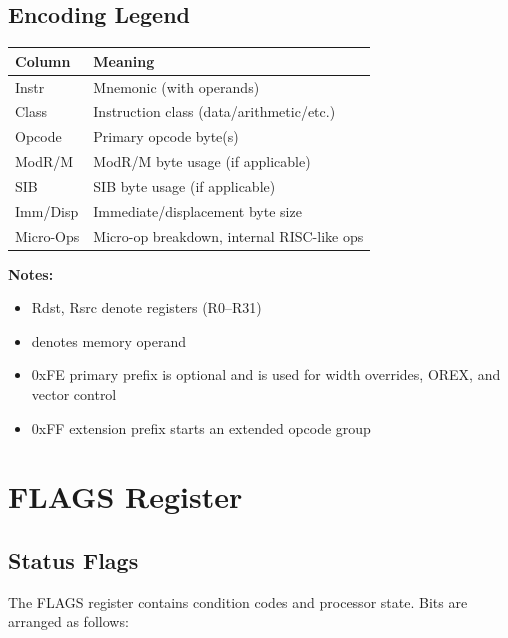 \documentclass[11pt]{article}
\begin{document}
\subsection{Encoding Legend}

\begin{table}[h]
\centering
\begin{tabular}{@{}ll@{}}
\toprule
\textbf{Column} & \textbf{Meaning} \\ \midrule
Instr & Mnemonic (with operands) \\
Class & Instruction class (data/arithmetic/etc.) \\
Opcode & Primary opcode byte(s) \\
ModR/M & ModR/M byte usage (if applicable) \\
SIB & SIB byte usage (if applicable) \\
Imm/Disp & Immediate/displacement byte size \\
Micro-Ops & Micro-op breakdown, internal RISC-like ops \\ \bottomrule
\end{tabular}
\end{table}

\textbf{Notes:}

\begin{itemize}
    \item Rdst, Rsrc denote registers (R0--R31)
    \item [mem] denotes memory operand
    \item 0xFE primary prefix is optional and is used for width overrides, OREX, and vector control
    \item 0xFF extension prefix starts an extended opcode group
\end{itemize}

\section{FLAGS Register}

\subsection{Status Flags}

The FLAGS register contains condition codes and processor state. Bits are arranged as follows:
\end{document}
